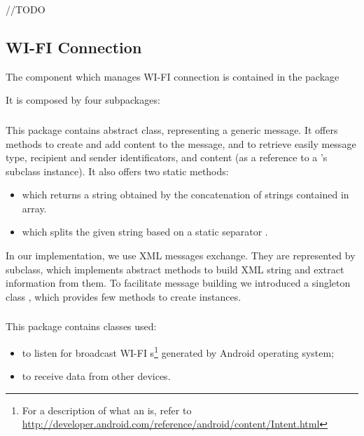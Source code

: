 //TODO

\subsection{WI-FI Connection}
The component which manages WI-FI connection is contained in the package 
\begin{center}
\end{center} 
It is composed by four subpackages:
	\\
	\subsubsection{}
	This package contains  abstract class, representing a generic message. It offers methods to create and add content to the message, and to retrieve easily message type, recipient and sender identificators, and content (as a reference to a 's subclass instance). It also offers two static methods:
	\begin{itemize}
		\item {} which returns a string obtained by the concatenation of strings contained in  array.
		\item {} which splits the given string based on a static separator . 
	\end{itemize}
	In our implementation, we use XML messages exchange. They are represented by  subclass, which implements  abstract methods to build XML string and extract information from them. To facilitate message building we introduced a singleton class , which provides few methods to create  instances.
	\hfill\\
	\subsubsection{}
	This package contains classes used:
	\begin{itemize}
		\item to listen for broadcast WI-FI s\footnote{For a description of what an  is, refer to \url{http://developer.android.com/reference/android/content/Intent.html}} generated by Android operating system;
		\item to receive data from other devices.
	\end{itemize}
	
